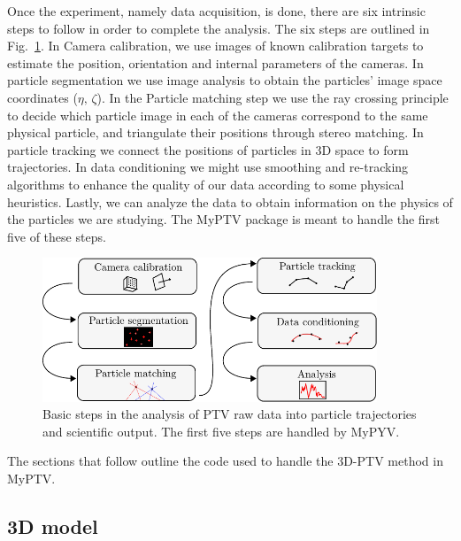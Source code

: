 \documentclass[10pt,a4paper]{article}
\begin{document}
Once the experiment, namely data acquisition, is done, there are six intrinsic steps to follow in order to complete the analysis. The six steps are outlined in Fig.~\ref{fig:steps}. In Camera calibration, we use images of known calibration targets to estimate the position, orientation and internal parameters of the cameras. In particle segmentation we use image analysis to obtain the particles' image space coordinates ($\eta, \, \zeta$). In the Particle matching step we use the ray crossing principle to decide which particle image in each of the cameras correspond to the same physical particle, and triangulate their positions through stereo matching. In particle tracking we connect the positions of particles in 3D space to form trajectories. In data conditioning we might use smoothing and re-tracking algorithms to enhance the quality of our data according to some physical heuristics. Lastly, we can analyze the data to obtain information on the physics of the particles we are studying. The MyPTV package is meant to handle the first five of these steps.    



\begin{figure}
	\centering
	\includegraphics[width=10cm]{steps.pdf}
	\caption{Basic steps in the analysis of PTV raw data into particle trajectories and scientific output. The first five steps are handled by MyPYV. \label{fig:steps}}
\end{figure}


The sections that follow outline the code used to handle the 3D-PTV method in MyPTV.





\subsection{3D model}
\end{document}
